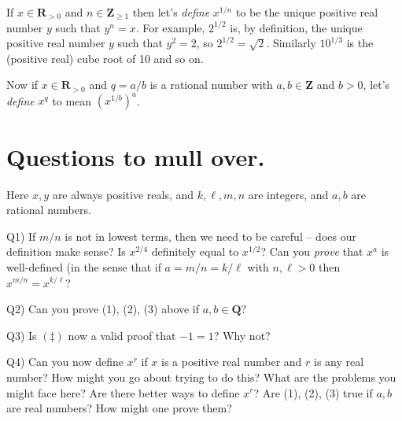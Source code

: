 \documentclass[10pt]{article}
\newcommand{\R}{\mathbf{R}}
\newcommand{\Q}{\mathbf{Q}}
\newcommand{\Z}{\mathbf{Z}}
\begin{document}
If $x\in\R_{>0}$ and $n\in\Z_{\geq1}$ then let's \emph{define} $x^{1/n}$ to be the unique positive real number $y$ such that $y^n=x$. For example, $2^{1/2}$ is, by definition, the unique positive real number $y$ such that $y^2=2$, so $2^{1/2}=\sqrt{2}$. Similarly $10^{1/3}$ is the (positive real) cube root of 10 and so on.

Now if $x\in\R_{>0}$ and $q=a/b$ is a rational number with $a,b\in\Z$ and $b>0$, let's \emph{define} $x^q$ to mean $(x^{1/b})^a$.

\medskip

\section*{Questions to mull over.}

Here $x,y$ are always positive reals, and $k,\ell,m,n$ are integers, and $a,b$ are rational numbers.

\smallskip

Q1) If $m/n$ is not in lowest terms, then we need to be careful -- does our definition make sense? Is $x^{2/4}$ definitely equal to $x^{1/2}$? Can you \emph{prove} that $x^a$ is well-defined (in the sense that if $a=m/n=k/\ell$ with $n,\ell>0$ then $x^{m/n}=x^{k/\ell}$?

\smallskip


Q2) Can you prove (1), (2), (3) above if $a,b\in\Q$?


\smallskip

Q3) Is $(\ddag)$ now a valid proof that $-1=1$? Why not?


\smallskip

Q4) Can you now define $x^r$ if $x$ is a positive real number and $r$ is any real number? How might you go about trying to do this? What are the problems you might face here? Are there better ways to define $x^r$? Are (1), (2), (3) true if $a,b$ are real numbers? How might one prove them? 
\end{document}
